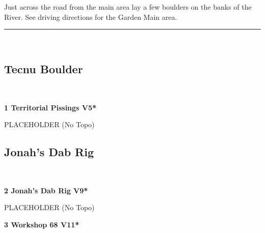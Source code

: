 \begin{multicols}{2}
\begin{minipage}{\columnwidth}
Just across the road from the main area lay a few boulders on the banks of the River. See driving directions for the Garden Main area.
\end{minipage}

\end{multicols}
\rule{\textwidth}{1pt}
\begin{multicols}{2}
	\begin{minipage}{\columnwidth}
	\
	\end{minipage}
			\subsection*{Tecnu Boulder}\label{bf:Tecnu Boulder}
			\begin{minipage}{\columnwidth}
			\
			\end{minipage}
			
					\begin{minipage}{\linewidth}	
					\label{rt:Territorial Pissings}
\colorbox{RoyalBlue!20}{
\textbf{
1 Territorial Pissings V5*  
}
}

					\begin{adjustwidth}{0.5cm}{}				
					PLACEHOLDER
						\newline (No Topo) 
					\end{adjustwidth}
					\end{minipage}
			\subsection*{Jonah's Dab Rig}\label{bf:Jonah's Dab Rig}
			\begin{minipage}{\columnwidth}
			\
			\end{minipage}
			
					\begin{minipage}{\linewidth}	
					\label{rt:Jonah's Dab Rig}
\colorbox{Goldenrod!50}{
\textbf{
2 Jonah's Dab Rig V9*  
}
}

					\begin{adjustwidth}{0.5cm}{}				
					PLACEHOLDER
						\newline (No Topo) 
					\end{adjustwidth}
					\end{minipage}
					\begin{minipage}{\linewidth}	
					\label{rt:Workshop 68}
\colorbox{red!20}{
\textbf{
3 Workshop 68 V11*  
}
}


\end{minipage}
\end{multicols}
